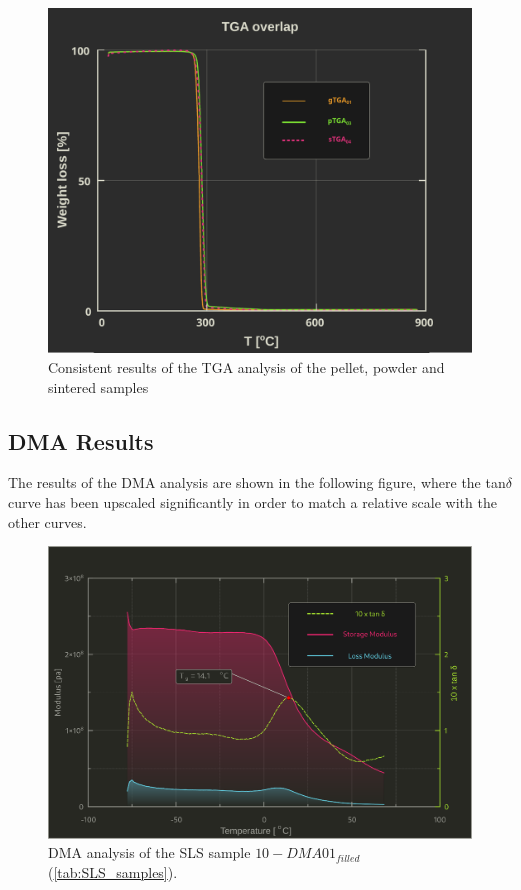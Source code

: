 \documentclass{article}
\begin{document}
                \begin{figure}[h!]
                    \centering
                    \includegraphics[width=\textwidth]{Pictures/Thermal_analysis_plots/TGA_catalogued/Fixed/TGA_overlapped.pdf}
                    \caption{Consistent results of the TGA analysis of the pellet, powder and sintered samples}
                    \label{fig:TGA_overlapped}
                \end{figure}

        \subsection{DMA Results\label{DMA_Results}}

        The results of the DMA analysis are shown in the following figure, where the tan$\delta$ curve has been upscaled significantly 
        in order to match a relative scale with the other curves. \\ 

            \begin{figure}[h!]
                \centering
                \includegraphics[width=\textwidth]{Pictures/Thermal_analysis_plots/DMA.eps}
                \caption{DMA analysis of the SLS sample $10-DMA01_{filled}$ (\ref{tab:SLS_samples}).}
                \label{fig:DMA_plot}
            \end{figure}
\end{document}
